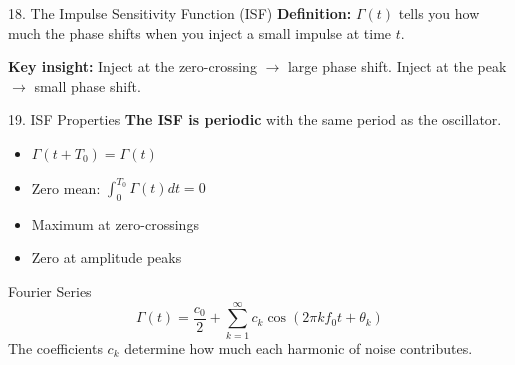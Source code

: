\documentclass[aspectratio=169, 11pt]{beamer}
\begin{document}
\begin{frame}{18. The Impulse Sensitivity Function (ISF)}
    \textbf{Definition:} $\Gamma(t)$ tells you how much the phase shifts when you inject a small impulse at time $t$.

    \vspace{0.5em}
    \begin{center}
    \end{center}

    \vspace{0.3em}
    \textbf{Key insight:} Inject at the zero-crossing $\rightarrow$ large phase shift. Inject at the peak $\rightarrow$ small phase shift.
\end{frame}

\begin{frame}{19. ISF Properties}
    \textbf{The ISF is periodic} with the same period as the oscillator.

    \vspace{0.5em}
    \begin{itemize}
        \item $\Gamma(t + T_0) = \Gamma(t)$
        \item Zero mean: $\int_0^{T_0} \Gamma(t) dt = 0$
        \item Maximum at zero-crossings
        \item Zero at amplitude peaks
    \end{itemize}

    \vspace{0.5em}
    \begin{block}{Fourier Series}
        \[ \Gamma(t) = \frac{c_0}{2} + \sum_{k=1}^{\infty} c_k \cos(2\pi k f_0 t + \theta_k) \]
        The coefficients $c_k$ determine how much each harmonic of noise contributes.
    \end{block}
\end{frame}
\end{document}
